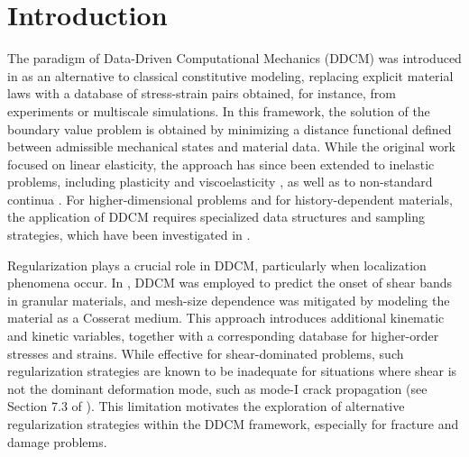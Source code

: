 \documentclass[10pt]{cas-sc}
\begin{document}
\maketitle
	
	
	
\section{Introduction}

The paradigm of Data-Driven Computational Mechanics (DDCM) was introduced in \cite{Kirchdoerfer2016} as an alternative to classical constitutive modeling, replacing explicit material laws with a database of stress-strain pairs obtained, for instance, from experiments or multiscale simulations. In this framework, the solution of the boundary value problem is obtained by minimizing a distance functional defined between admissible mechanical states and material data. While the original work focused on linear elasticity, the approach has since been extended to inelastic problems, including plasticity and viscoelasticity \cite{Eggersmann2019}, as well as to non-standard continua \cite{Karapiperis2021a}. For higher-dimensional problems and for history-dependent materials, the application of DDCM requires specialized data structures and sampling strategies, which have been investigated in \cite{Dandin2024,Rocha2025}.

Regularization plays a crucial role in DDCM, particularly when localization phenomena occur. In \cite{Karapiperis2021a}, DDCM was employed to predict the onset of shear bands in granular materials, and mesh-size dependence was mitigated by modeling the material as a Cosserat medium. This approach introduces additional kinematic and kinetic variables, together with a corresponding database for higher-order stresses and strains. While effective for shear-dominated problems, such regularization strategies are known to be inadequate for situations where shear is not the dominant deformation mode, such as mode-I crack propagation (see Section 7.3 of \cite{sluys1992wave}). This limitation motivates the exploration of alternative regularization strategies within the DDCM framework, especially for fracture and damage problems.
\end{document}
